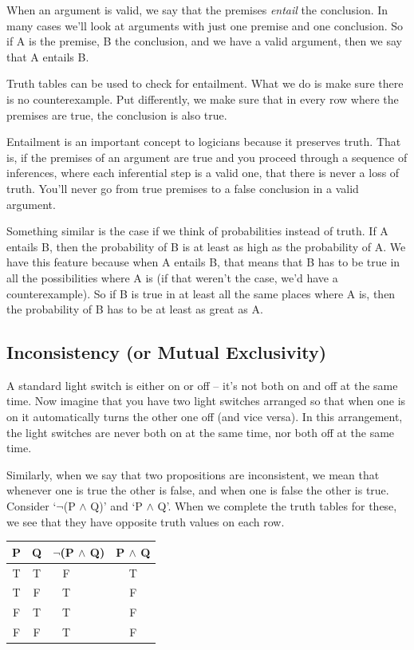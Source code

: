 \documentclass[]{tufte-book}
\begin{document}
When an argument is valid, we say that the premises \emph{entail} the conclusion. In many cases we'll look at arguments with just one premise and one conclusion. So if A is the premise, B the conclusion, and we have a valid argument, then we say that A entails B.

Truth tables can be used to check for entailment. What we do is make sure there is no counterexample. Put differently, we make sure that in every row where the premises are true, the conclusion is also true.

Entailment is an important concept to logicians because it preserves truth. That is, if the premises of an argument are true and you proceed through a sequence of inferences, where each inferential step is a valid one, that there is never a loss of truth. You'll never go from true premises to a false conclusion in a valid argument.

Something similar is the case if we think of probabilities instead of truth. If A entails B, then the probability of B is at least as high as the probability of A. We have this feature because when A entails B, that means that B has to be true in all the possibilities where A is (if that weren't the case, we'd have a counterexample). So if B is true in at least all the same places where A is, then the probability of B has to be at least as great as A.

\hypertarget{inconsistency-or-mutual-exclusivity}{%
\subsection{Inconsistency (or Mutual Exclusivity)}\label{inconsistency-or-mutual-exclusivity}}

A standard light switch is either on or off -- it's not both on and off at the same time. Now imagine that you have two light switches arranged so that when one is on it automatically turns the other one off (and vice versa). In this arrangement, the light switches are never both on at the same time, nor both off at the same time.

Similarly, when we say that two propositions are inconsistent, we mean that whenever one is true the other is false, and when one is false the other is true. Consider `\(\neg\)(P \(\wedge\) Q)' and `P \(\wedge\) Q'. When we complete the truth tables for these, we see that they have opposite truth values on each row.

\begin{longtable}[]{@{}cccc@{}}
\toprule
P & Q & \(\neg\)(P \(\wedge\) Q) & P \(\wedge\) Q\tabularnewline
\midrule
\endhead
T & T & F\(~~~~~~~~~~\) & T\tabularnewline
T & F & T\(~~~~~~~~~~\) & F\tabularnewline
F & T & T\(~~~~~~~~~~\) & F\tabularnewline
F & F & T\(~~~~~~~~~~\) & F\tabularnewline
\bottomrule
\end{longtable}
\end{document}
